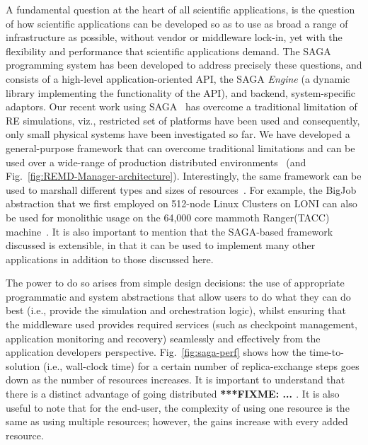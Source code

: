 \documentclass{rspublic}
\newcommand{\fixme}[1]{ { \bf{ ***FIXME: #1 }} }
\newcommand{\fixme}[1]{}
\begin{document}
A fundamental question at the heart of all scientific applications, is
the question of how scientific applications can be developed so as to
use as broad a range of infrastructure as possible, without vendor or
middleware lock-in, yet with the flexibility and performance that
scientific applications demand. The SAGA programming system has been
developed to address precisely these questions, and consists of a
high-level application-oriented API, the SAGA {\it Engine} (a dynamic
library implementing the functionality of the API), and backend,
system-specific adaptors.  Our recent work using
SAGA~\cite{saga-papers} has overcome a traditional limitation of RE
simulations, viz., restricted set of platforms have been used and
consequently, only small physical systems have been investigated so
far. We have developed a general-purpose framework that can overcome
traditional limitations and can be used over a wide-range of
production distributed environments~\cite{saga-royalsoc} (and
Fig.~\ref{fig:REMD-Manager-architecture}).  Interestingly, the same
framework can be used to marshall different types and sizes of
resources~\cite{saga-papers}. For example, the BigJob abstraction that
we first employed on 512-node Linux Clusters on LONI can also be used
for monolithic usage on the 64,000 core mammoth Ranger(TACC)
machine~\cite{saga-iccs09}.  It is also important to mention that the
SAGA-based framework discussed is extensible, in that it can be used
to implement many other applications in addition to those discussed
here.

The power to do so arises from simple design decisions: the use of
appropriate programmatic and system abstractions that allow users to
do what they can do best (i.e., provide the simulation and
orchestration logic), whilst ensuring that the middleware used
provides required services (such as checkpoint management, application
monitoring and recovery) seamlessly and effectively from the
application developers perspective.  Fig.~\ref{fig:saga-perf} shows
how the time-to-solution (i.e., wall-clock time) for a certain number
of replica-exchange steps goes down as the number of resources
increases. It is important to understand that there is a distinct
advantage of going distributed \fixme{...}.  It is also useful to note
that for the end-user, the complexity of using one resource is the
same as using multiple resources; however, the gains increase with
every added resource.
\end{document}
